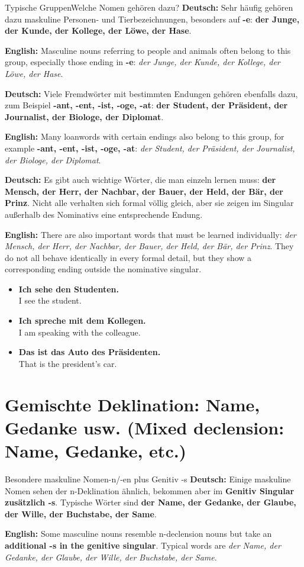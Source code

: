 \documentclass[a4paper,11pt]{article}
\newcommand{\GermanText}[1]{\textbf{Deutsch: }#1\par}
\newcommand{\EnglishText}[1]{{\small\color{SoftGray}\textbf{English: }#1\par}}
\newcommand{\ExampleItem}[2]{\item \textbf{#1}\\{\small\color{SoftGray}#2}}
\begin{document}
\begin{grammarentry}{Typische Gruppen}{Welche Nomen gehören dazu?}
\GermanText{Sehr häufig gehören dazu maskuline Personen- und Tierbezeichnungen, besonders auf \textbf{-e}: \textbf{der Junge, der Kunde, der Kollege, der Löwe, der Hase}.}
\EnglishText{Masculine nouns referring to people and animals often belong to this group, especially those ending in \textbf{-e}: \emph{der Junge, der Kunde, der Kollege, der Löwe, der Hase}.}

\GermanText{Viele Fremdwörter mit bestimmten Endungen gehören ebenfalls dazu, zum Beispiel \textbf{-ant, -ent, -ist, -oge, -at}: \textbf{der Student, der Präsident, der Journalist, der Biologe, der Diplomat}.}
\EnglishText{Many loanwords with certain endings also belong to this group, for example \textbf{-ant, -ent, -ist, -oge, -at}: \emph{der Student, der Präsident, der Journalist, der Biologe, der Diplomat}.}

\GermanText{Es gibt auch wichtige Wörter, die man einzeln lernen muss: \textbf{der Mensch, der Herr, der Nachbar, der Bauer, der Held, der Bär, der Prinz}. Nicht alle verhalten sich formal völlig gleich, aber sie zeigen im Singular außerhalb des Nominativs eine entsprechende Endung.}
\EnglishText{There are also important words that must be learned individually: \emph{der Mensch, der Herr, der Nachbar, der Bauer, der Held, der Bär, der Prinz}. They do not all behave identically in every formal detail, but they show a corresponding ending outside the nominative singular.}
\end{grammarentry}

\begin{exbox}
\begin{itemize}
\ExampleItem{Ich sehe den Studenten.}{I see the student.}
\ExampleItem{Ich spreche mit dem Kollegen.}{I am speaking with the colleague.}
\ExampleItem{Das ist das Auto des Präsidenten.}{That is the president's car.}
\end{itemize}
\end{exbox}

\section{Gemischte Deklination: Name, Gedanke usw. \textnormal{(Mixed declension: Name, Gedanke, etc.)}}
\begin{grammarentry}{Besondere maskuline Nomen}{-n/-en plus Genitiv -s}
\GermanText{Einige maskuline Nomen sehen der n-Deklination ähnlich, bekommen aber im \textbf{Genitiv Singular zusätzlich -s}. Typische Wörter sind \textbf{der Name, der Gedanke, der Glaube, der Wille, der Buchstabe, der Same}.}
\EnglishText{Some masculine nouns resemble n-declension nouns but take an \textbf{additional -s in the genitive singular}. Typical words are \emph{der Name, der Gedanke, der Glaube, der Wille, der Buchstabe, der Same}.}
\end{grammarentry}
\end{document}
